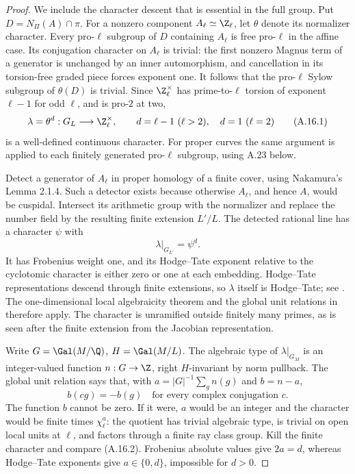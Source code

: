 \begin{proof}
We include the character descent that is essential in the full
group. Put $D=N_\Pi(A)\cap\pi$. For a nonzero component
$A_\ell\simeq\Z_\ell$, let $\theta$ denote its normalizer
character. Every pro-$\ell$ subgroup of $D$ containing $A_\ell$
is free pro-$\ell$ in the affine case. Its conjugation character
on $A_\ell$ is trivial: the first nonzero Magnus term of a
generator is unchanged by an inner automorphism, and cancellation
in its torsion-free graded piece forces exponent one. It follows
that the pro-$\ell$ Sylow subgroup of $\theta(D)$ is trivial.
Since $\Z_\ell^\times$ has prime-to-$\ell$ torsion of exponent
$\ell-1$ for odd $\ell$, and is pro-$2$ at two,
\[
 \lambda=\theta^d:G_L\longrightarrow\Z_\ell^\times,
 \qquad d=\ell-1\ (\ell>2),\quad d=1\ (\ell=2)
                                                               \tag{A.16.1}
\]
is a well-defined continuous character. For proper curves the
same argument is applied to each finitely generated pro-$\ell$
subgroup, using A.23 below.

Detect a generator of $A_\ell$ in proper homology of a finite
cover, using Nakamura's Lemma 2.1.4. Such a detector exists
because otherwise $A_\ell$, and hence $A$, would be cuspidal.
Intersect its arithmetic group with the normalizer and replace
the number field by the resulting finite extension $L'/L$.
The detected rational line has a character $\psi$ with
\[
                    \lambda|_{G_{L'}}=\psi^d.
                                                               \tag{A.16.2}
\]
It has Frobenius weight one, and its Hodge--Tate exponent relative
to the cyclotomic character is either zero or one at each
embedding. Hodge--Tate representations descend through finite
extensions, so $\lambda$ itself is Hodge--Tate; see
\cite[Chapter III, Appendix, Corollary 2]{A_Serre}.
The one-dimensional local algebraicity theorem and the global
unit relations in \cite[Chapter III, \S1.2; Chapter II, \S3.1]{A_Serre}
therefore apply. The character is unramified outside finitely
many primes, as is seen after the finite extension from the
Jacobian representation.

Write $G=\Gal(M/\Q)$, $H=\Gal(M/L)$. The algebraic type of
$\lambda|_{G_M}$ is an integer-valued function $n:G\to\Z$,
right $H$-invariant by norm pullback. The global unit relation
says that, with $a=|G|^{-1}\sum_g n(g)$ and $b=n-a$,
\[
                b(cg)=-b(g)
       \quad\text{for every complex conjugation }c.
                                                               \tag{A.16.3}
\]
The function $b$ cannot be zero. If it were, $a$ would be an
integer and the character would be finite times $\chi_\ell^a$:
the quotient has trivial algebraic type, is trivial on open
local units at $\ell$, and factors through a finite ray class
group. Kill the finite character and compare (A.16.2).
Frobenius absolute values give $2a=d$, whereas Hodge--Tate
exponents give $a\in\{0,d\}$, impossible for $d>0$.


\end{proof}
